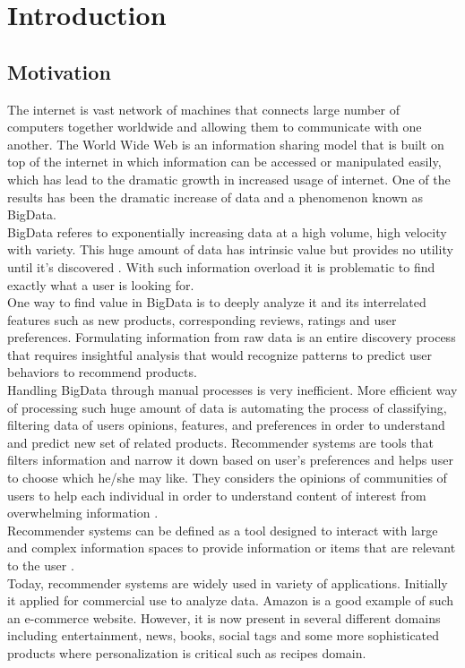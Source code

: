 \chapter{Introduction}
\section{Motivation}
The internet is vast network of machines that connects large number of computers together worldwide and allowing them to communicate with one another. The World Wide Web is an information sharing model that is built on top of the internet in which information can be accessed or manipulated easily, which has lead to the dramatic growth in increased usage of internet. One of the results has been the dramatic increase of data and a phenomenon known as BigData.
\\
BigData referes to exponentially increasing data at a high volume, high velocity with variety. This huge amount of data has intrinsic value but provides no utility until it's discovered \cite{2}. With such information overload it is problematic to find exactly what a user is looking for. 
\\
One way to find value in BigData is to deeply analyze it and its interrelated features such as new products, corresponding reviews, ratings and user preferences. Formulating information from raw data is an entire discovery process that requires insightful analysis that would recognize patterns to predict user behaviors to recommend products.
\\
Handling BigData through manual processes is very inefficient. More efficient way of processing such huge amount of data is automating the process of classifying, filtering data of users opinions, features, and preferences in order to understand and predict new set of related products.  Recommender systems are tools that filters information and narrow it down based on user's preferences and helps user to choose which he/she may like. They considers the opinions of communities of users to help each individual in order to understand content of interest from overwhelming information \cite{1}. 
\\ 
Recommender systems can be defined as a tool designed to interact with large and complex information spaces to provide information or items that are relevant to the user \cite{4}.
\\
Today, recommender systems are widely used in variety of applications. Initially it applied for commercial use to analyze data. Amazon is a good example of such an e-commerce website. However, it is now present in several different domains including entertainment, news, books, social tags and some more sophisticated products where personalization is critical such as recipes domain.
